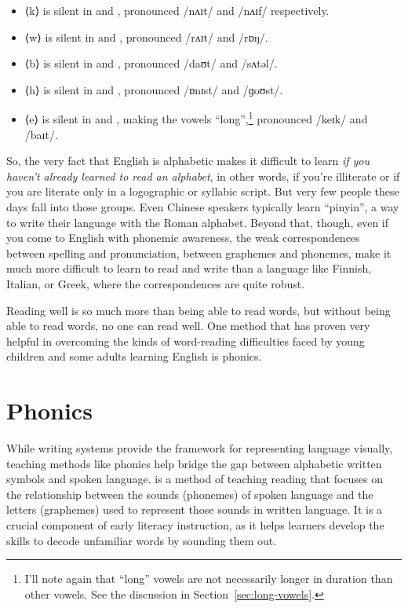 \begin{itemize}[noitemsep]
    \item ⟨k⟩ is silent in  and , pronounced /nʌɪt/ and /nʌɪf/ respectively.
    \item ⟨w⟩ is silent in  and , pronounced /rʌɪt/ and /rɒŋ/.
    \item ⟨b⟩ is silent in  and , pronounced /daʊt/ and /sʌtəl/.
    \item ⟨h⟩ is silent in  and , pronounced /ɒnɪst/ and /ɡoʊst/.
    \item ⟨e⟩ is silent in  and , making the vowels ``long'',\footnote{I'll note again that ``long'' vowels are not necessarily longer in duration than other vowels. See the discussion in Section~\ref{sec:long-vowels}.} pronounced /keɪk/ and /baɪt/.
\end{itemize}

So, the very fact that English is alphabetic makes it difficult to learn \emph{if you haven't already learned to read an alphabet}, in other words, if you're illiterate or if you are literate only in a logographic or syllabic script. But very few people these days fall into those groups. Even Chinese speakers typically learn ``pinyin'', a way to write their language with the Roman alphabet. Beyond that, though, even if you come to English with phonemic awareness, the weak correspondences between spelling and pronunciation, between graphemes and phonemes, make it much more difficult to learn to read and write than a language like Finnish, Italian, or Greek, where the correspondences are quite robust.

Reading well is so much more than being able to read words, but without being able to read words, no one can read well. One method that has proven very helpful in overcoming the kinds of word-reading difficulties faced by young children and some adults learning English is phonics.

\section{Phonics} \label{sec:phonics}

While writing systems provide the framework for representing language visually, teaching methods like phonics help bridge the gap between alphabetic written symbols and spoken language.  is a method of teaching reading that focuses on the relationship between the sounds (phonemes) of spoken language and the letters (graphemes) used to represent those sounds in written language. It is a crucial component of early literacy instruction, as it helps learners develop the skills to decode unfamiliar words by sounding them out.

